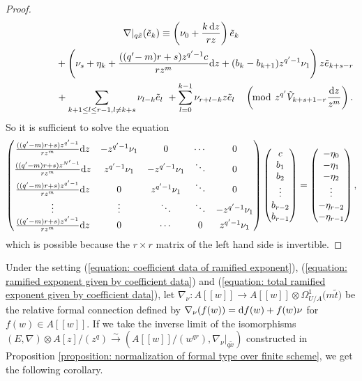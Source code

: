 \documentclass[pdftex]{sigma}
\numberwithin{equation}{section}
\begin{document}
\begin{proof}
\begin{gather*}
 \nabla|_{q\tilde{x}} ( \tilde{e}_k ) \equiv
 \left( \nu_0 + \frac {k\,{\rm d}z} {rz} \right) \tilde{e}_k\\
 \hphantom{\nabla|_{q\tilde{x}} ( \tilde{e}_k ) \equiv}{}
 +\left( \nu_s +\eta_k + \frac { ( (q'\!-m)r+s )z^{q'-1} c } {r z^m} {\rm d}z
 +(b_k-b_{k+1})z^{q'-1}\nu_1 \right) z \tilde{e}_{k+s-r}
 \\
 \hphantom{\nabla|_{q\tilde{x}} ( \tilde{e}_k ) \equiv}{}
 +\sum_{k+1\leq l \leq r-1, l \neq k+s} \nu_{l-k} \tilde{e}_l
 \ +\sum_{l=0}^{k-1} \nu_{r+l-k} z \tilde{e}_l
 \quad
 \left( \!\bmod \ z^{q'}\tilde{V}_{k+s+1-r} \frac {{\rm d}z} {z^m} \right).
\end{gather*}
So it is sufficient to solve the equation
\begin{equation*}
 \begin{pmatrix}
 \frac{((q'-m)r+s)z^{q'-1}}{r z^m} {\rm d}z & -z^{q'-1}\nu_1 & 0 & \cdots & 0 \vspace{1mm}\\
 \frac { ((q'-m)r+s)z^{N'-1} } {r z^m} {\rm d}z & z^{q'-1}\nu_1 & -z^{q'-1}\nu_1 & \ddots & 0 \vspace{1mm}\\
 \frac { ((q'-m)r+s)z^{q'-1} } {r z^m} {\rm d}z & 0 & z^{q'-1}\nu_1 & \ddots & 0 \vspace{1mm}\\
 \vdots & \vdots & \ddots & \ddots & -z^{q'-1}\nu_1 \\
 \frac{((q'-m)r+s)z^{q'-1}} {r z^m} {\rm d}z
 & 0 & \cdots & 0 & z^{q'-1}\nu_1
 \end{pmatrix}
 \begin{pmatrix} c \\ b_1 \\ b_2 \\ \vdots \\ b_{r-2} \\ b_{r-1} \end{pmatrix}
 =
 \begin{pmatrix} -\eta_0 \\ -\eta_1 \\ -\eta_2 \\
 \vdots \\ -\eta_{r-2} \\ -\eta_{r-1} \end{pmatrix},
\end{equation*}
which is possible because the $r\times r$ matrix of the left hand side
is invertible.
\end{proof}

Under the setting
(\ref{equation: coefficient data of ramified exponent}),
(\ref{equation: ramified exponent given by coefficient data})
and (\ref{equation: total ramified exponent given by coefficient data}),
let
$\nabla_{\nu}\colon A[[w]]\longrightarrow A[[w]]\otimes \Omega^1_{U/A}\big(m\tilde{t}\big)$
be the relative formal connection
defined by $\nabla_{\nu}(f(w))={\rm d}f(w)+f(w)\nu$
for $f(w)\in A[[w]]$.
If we take the inverse limit of the isomorphisms
$ (E,\nabla)\otimes A[z]/(z^{q})\stackrel{\sim}\longrightarrow
 (A[[w]]/(w^{qr}),\nabla_{\nu}|_{q\tilde{x}})$
constructed in Proposition \ref{proposition: normalization of formal type over finite scheme},
we get the following corollary.
\end{document}
